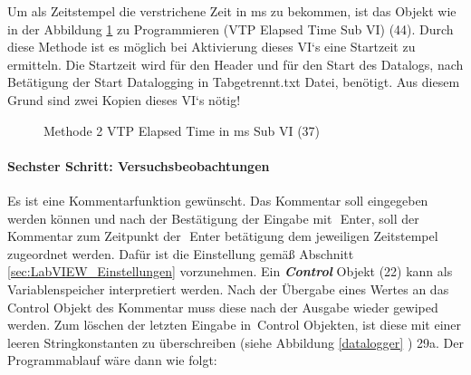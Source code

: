 {\noindent Um als Zeitstempel die verstrichene Zeit in ms zu bekommen, ist das Objekt wie in der Abbildung \ref{fig:vtp_elapsed_time} zu Programmieren (VTP Elapsed Time Sub VI) (44). Durch diese Methode ist es möglich bei Aktivierung dieses VI`s eine Startzeit zu ermitteln. Die Startzeit wird für den Header und für den Start des Datalogs, nach Betätigung der Start {\Menlo Datalogging in Tabgetrennt.txt} Datei, benötigt. Aus diesem Grund sind zwei Kopien dieses VI`s nötig!




 

\begin{figure}[!ht] %
     \hfill     
     \caption[]{Methode 2 \glqq VTP Elapsed Time in ms\grqq{} Sub VI (37)\\     	
  }
  \label{fig:vtp_elapsed_time}
   \end{figure}


\paragraph{Sechster Schritt: Versuchsbeobachtungen} Es ist eine Kommentarfunktion gewünscht. Das Kommentar soll eingegeben werden können und nach der Bestätigung der Eingabe mit\, \,{\Menlo Enter}, soll der Kommentar zum Zeitpunkt der\, \,{\Menlo Enter} betätigung dem jeweiligen Zeitstempel zugeordnet werden. Dafür ist die Einstellung gemäß Abschnitt \ref{sec:LabVIEW_Einstellungen} vorzunehmen. Ein \textit{\textbf{Control}} Objekt (22) kann als Variablenspeicher interpretiert werden. Nach der Übergabe eines Wertes an das \,{\Menlo Control} Objekt des Kommentar muss diese nach der Ausgabe wieder gewiped werden. Zum \glqq löschen\grqq{} der letzten Eingabe in \,{\Menlo Control} Objekten, ist diese mit einer leeren Stringkonstanten zu überschreiben (siehe Abbildung \ref{datalogger} ) 29a. Der Programmablauf wäre dann wie folgt:


}
